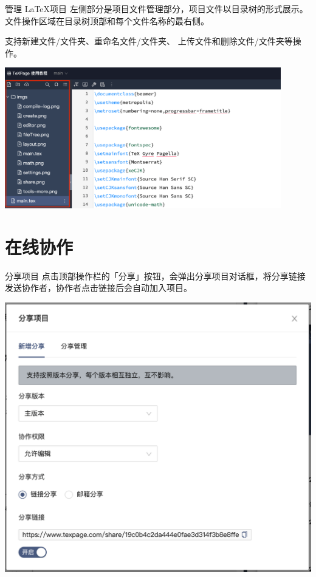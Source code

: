 \documentclass{beamer}
\begin{document}
\begin{frame}{管理 \LaTeX 项目}
左侧部分是项目文件管理部分，项目文件以目录树的形式展示。
文件操作区域在目录树顶部和每个文件名称的最右侧。

支持新建文件/文件夹、重命名文件/文件夹、
上传文件和删除文件/文件夹等操作。

\begin{center}
\includegraphics[width=0.9\textwidth]{imgs/fileTree.png}
\end{center}
\end{frame}


\section{在线协作}

\begin{frame}{分享项目}
点击顶部操作栏的「分享」按钮，会弹出分享项目对话框，将分享链接发送协作者，协作者点击链接后会自动加入项目。

\begin{center}
\includegraphics[width=.7\textwidth]{imgs/share.png}
\end{center}

\end{frame}
\end{document}
